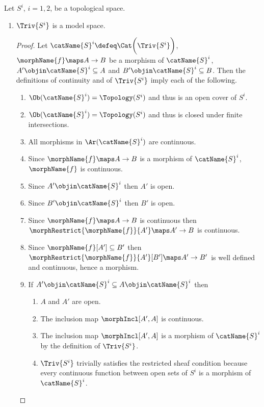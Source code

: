 \documentclass{article}
\begin{document}
\begin{lemma}
\label{lem:trivmod}
Let $S^i$, $i=1,2$, be a topological space.

\begin{enumerate}
\item
$\Triv{S^i}$ is a model space.

\begin{proof}
Let $\catName{S}^i \defeq \Cat \biggl ( \Triv{S^i} \biggr )$,
$\morphName{f} \maps A \to B$ be a morphism of $\catName{S}^i$,
$A' \objin \catName{S}^i \subseteq A$ and
$B' \objin \catName{S}^i \subseteq B$. Then the definitions of
continuity and of $\Triv{S^i}$ imply each of the following.
\begin{enumerate}
\item $\Ob(\catName{S}^i)=\Topology(S^i)$ and thus is an open cover of
$S^i$.
\item $\Ob(\catName{S}^i)=\Topology(S^i)$ and thus is closed under
finite intersections.
\item All morphisms in $\Ar(\catName{S}^i)$ are continuous.
\item Since $\morphName{f} \maps A \to B$ is a morphism of
$\catName{S}^i$, $\morphName{f}$ is continuous.
\item
Since $A' \objin \catName{S}^i$ then $A'$ is open.
\item
Since $B' \objin \catName{S}^i$ then $B'$ is open.
\item
Since $\morphName{f} \maps A \to B$ is continuous then
$\morphRestrict{\morphName{f}}{A'} \maps A' \to B$ is continuous.
\item
Since $\morphName{f}[A'] \subseteq B'$ then
$\morphRestrict{\morphName{f}}{A'}[B'] \maps A' \to B'$ is well defined and
continuous, hence a morphism.
\item If $A' \objin \catName{S}^i \subseteq A \objin \catName{S}^i$ then
\begin{enumerate}
\item $A$ and $A'$ are open.
\item
The inclusion map $\morphIncl[A',A]$ is continuous.
\item The inclusion map $\morphIncl[A',A]$ is a
morphism of $\catName{S}^i$ by the definition of $\Triv{S^i}$.

\item $\Triv{S^i}$ trivially satisfies the restricted sheaf condition
because every continuous function between open sets of $S^i$ is a
morphism of $\catName{S}^i$.
\end{enumerate}
\end{enumerate}
\end{proof}


\end{enumerate}
\end{lemma}
\end{document}
